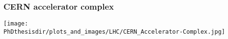 \begin{frame}
\frametitle{CERN accelerator complex}
\begin{center}
\texttt{[image: \\PhDthesisdir/plots\_and\_images/LHC/CERN\_Accelerator-Complex.jpg]}
\end{center}
\end{frame}

